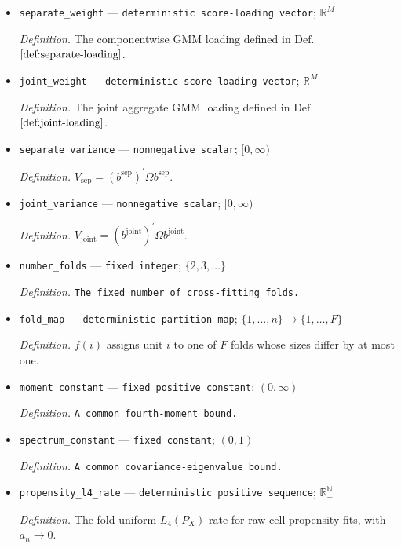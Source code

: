 \documentclass{article}
\begin{document}
\begin{itemize}
  \item \texttt{separate\_\allowbreak{}weight} --- \texttt{deterministic score-\allowbreak{}loading vector}; \(\mathbb R^M\)
  \par\smallskip\noindent\emph{Definition.} The componentwise GMM loading defined in \(\mathrm{Def.}\) \(\ref{def:separate-loading}\).
  \item \texttt{joint\_\allowbreak{}weight} --- \texttt{deterministic score-\allowbreak{}loading vector}; \(\mathbb R^M\)
  \par\smallskip\noindent\emph{Definition.} The joint aggregate GMM loading defined in \(\mathrm{Def.}\) \(\ref{def:joint-loading}\).
  \item \texttt{separate\_\allowbreak{}variance} --- \texttt{nonnegative scalar}; \([0,\infty)\)
  \par\smallskip\noindent\emph{Definition.} \(V_{\mathrm{sep}}=(b^{\mathrm{sep}})^{\prime}\Omega b^{\mathrm{sep}}\).
  \item \texttt{joint\_\allowbreak{}variance} --- \texttt{nonnegative scalar}; \([0,\infty)\)
  \par\smallskip\noindent\emph{Definition.} \(V_{\mathrm{joint}}=(b^{\mathrm{joint}})^{\prime}\Omega b^{\mathrm{joint}}\).
  \item \texttt{number\_\allowbreak{}folds} --- \texttt{fixed integer}; \(\{2,3,\ldots\}\)
  \par\smallskip\noindent\emph{Definition.} \texttt{The fixed number of cross-\allowbreak{}fitting folds.}
  \item \texttt{fold\_\allowbreak{}map} --- \texttt{deterministic partition map}; \(\{1,\ldots,n\}\to\{1,\ldots,F\}\)
  \par\smallskip\noindent\emph{Definition.} \(f(i)\) assigns unit \(i\) to one of \(F\) folds whose sizes differ by at most one.
  \item \texttt{moment\_\allowbreak{}constant} --- \texttt{fixed positive constant}; \((0,\infty)\)
  \par\smallskip\noindent\emph{Definition.} \texttt{A common fourth-\allowbreak{}moment bound.}
  \item \texttt{spectrum\_\allowbreak{}constant} --- \texttt{fixed constant}; \((0,1)\)
  \par\smallskip\noindent\emph{Definition.} \texttt{A common covariance-\allowbreak{}eigenvalue bound.}
  \item \texttt{propensity\_\allowbreak{}l4\_\allowbreak{}rate} --- \texttt{deterministic positive sequence}; \(\mathbb R_+^{\mathbb N}\)
  \par\smallskip\noindent\emph{Definition.} The fold-uniform \(L_4(P_X)\) rate for raw cell-propensity fits, with \(a_n\to0\).

\end{itemize}
\end{document}
